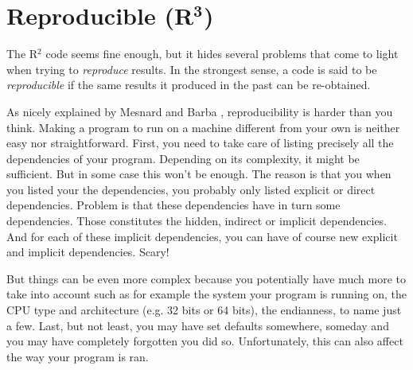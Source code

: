 \documentclass[a4paper,11pt]{article}
\begin{document}


\clearpage
\section*{Reproducible (R$^{\mathbf 3}$)}

The R$^2$ code seems fine enough, but it hides several problems that come to light when trying to {\em reproduce} results. In the strongest sense, a code is said to be {\em reproducible} if the same results it produced in the past can be re-obtained.  

As nicely explained by Mesnard and Barba \cite{Mesnard:2016}, 
reproducibility is harder than you think. 
Making a program to run on a machine different from your own
is neither easy nor straightforward.
First, you need to take care of listing precisely all the dependencies of your program.
Depending on its complexity, it might be sufficient.
But in some case this won't be enough.
The reason is that you when you listed your the dependencies,
you probably only listed explicit or direct dependencies.
Problem is that these dependencies have in turn some dependencies.
Those constitutes the hidden, indirect or implicit dependencies.
And for each of these implicit dependencies, 
you can have of course new explicit and implicit dependencies.
Scary!

But things can be even more complex because
you potentially have much more to take into account such as for example
the system your program is running on, 
the CPU type and architecture (e.g. 32 bits or 64 bits),
the endianness,
to name just a few.
Last, but not least,
you may have set defaults somewhere, someday
and you may have completely forgotten you did so.
Unfortunately, this can also affect the way your program is ran.
\end{document}
